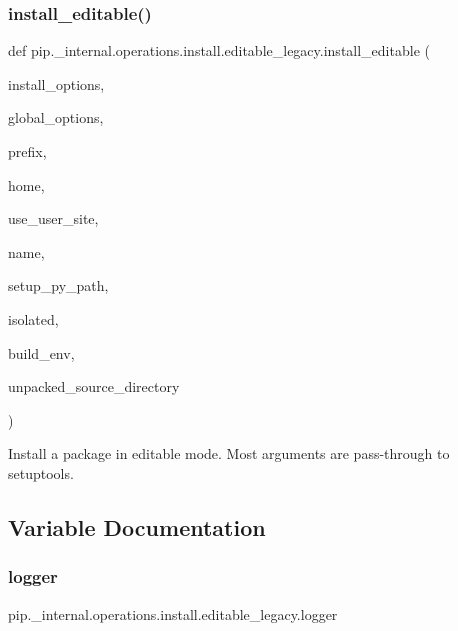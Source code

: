 \subsubsection{\texorpdfstring{install\+\_\+editable()}{install\_editable()}}
{\footnotesize\ttfamily def pip.\+\_\+internal.\+operations.\+install.\+editable\+\_\+legacy.\+install\+\_\+editable (\begin{DoxyParamCaption}\item[{}]{install\+\_\+options,  }\item[{}]{global\+\_\+options,  }\item[{}]{prefix,  }\item[{}]{home,  }\item[{}]{use\+\_\+user\+\_\+site,  }\item[{}]{name,  }\item[{}]{setup\+\_\+py\+\_\+path,  }\item[{}]{isolated,  }\item[{}]{build\+\_\+env,  }\item[{}]{unpacked\+\_\+source\+\_\+directory }\end{DoxyParamCaption})}

\begin{DoxyVerb}Install a package in editable mode. Most arguments are pass-through
to setuptools.
\end{DoxyVerb}
 

\subsection{Variable Documentation}
\mbox{\label{namespacepip_1_1__internal_1_1operations_1_1install_1_1editable__legacy_add0d611297ed481285809c0c2fb1dc46}} 
\subsubsection{\texorpdfstring{logger}{logger}}
{\footnotesize\ttfamily pip.\+\_\+internal.\+operations.\+install.\+editable\+\_\+legacy.\+logger}

